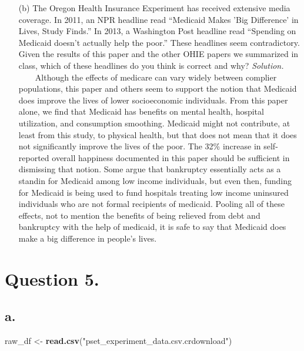 \documentclass[
]{article}
\newenvironment{Shaded}{\begin{snugshade}}{\end{snugshade}}
\newcommand{\KeywordTok}[1]{\textcolor[rgb]{0.13,0.29,0.53}{\textbf{#1}}}
\newcommand{\NormalTok}[1]{#1}
\newcommand{\StringTok}[1]{\textcolor[rgb]{0.31,0.60,0.02}{#1}}
\begin{document}
\begin{enumerate}
\item[(b)] The Oregon Health Insurance Experiment has received extensive media coverage. In 2011, an NPR headline read “Medicaid Makes ’Big Difference’ in Lives, Study Finds.” In 2013, a Washington Post headline read “Spending on Medicaid doesn’t actually help the poor.” These headlines seem contradictory. Given the results of this paper and the other OHIE papers we summarized in class, which of these headlines do you think is correct and why?
\newline
\newline
\textit{Solution.}\newline
    Although the effects of medicare can vary widely between complier populations, this paper and others seem to support the notion that Medicaid does improve the lives of lower socioeconomic individuals. From this paper alone, we find that Medicaid has benefits on mental health, hospital utilization, and consumption smoothing. Medicaid might not contribute, at least from this study, to physical health, but that does not mean that it does not significantly improve the lives of the poor. The 32\% increase in self-reported overall happiness documented in this paper should be sufficient in dismissing that notion. Some argue that bankruptcy essentially acts as a standin for Medicaid among low income individuals, but even then, funding for Medicaid is being used to fund hospitals treating low income uninsured individuals who are not formal recipients of medicaid. Pooling all of these effects, not to mention the benefits of being relieved from debt and bankruptcy with the help of medicaid, it is safe to say that Medicaid does make a big difference in people's lives. 

\end{enumerate}

\hypertarget{question-5.}{%
\section{Question 5.}\label{question-5.}}

\hypertarget{a.}{%
\subsection{a.}\label{a.}}

\begin{Shaded}
\begin{Highlighting}[]
\NormalTok{raw_df <-}\StringTok{ }\KeywordTok{read.csv}\NormalTok{(}\StringTok{"pset_experiment_data.csv.crdownload"}\NormalTok{)}
\end{Highlighting}
\end{Shaded}
\end{document}
